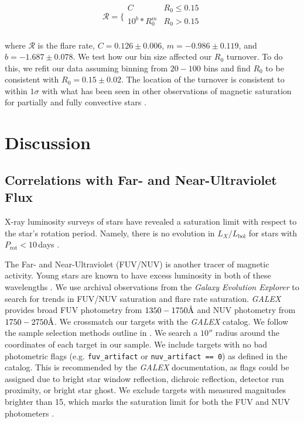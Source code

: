 \documentclass[twocolumn]{aastex631}
\newcommand{\angstrom}{\mbox{\normalfont\AA}}
\begin{document}
\begin{equation}
  \mathcal{R} =
  \Bigg \{
  \begin{array}{ll}
        C & R_0 \leq 0.15 \\
        10^b * R_0^m  & R_0 > 0.15 \\
  \end{array}
\end{equation}

where $\mathcal{R}$ is the flare rate, $C = 0.126 \pm 0.006$, $m = -0.986 \pm 0.119$, and $b = -1.687 \pm 0.078$.
We test how our bin size affected our $R_0$ turnover. To do this, we refit our data assuming binning from $20 - 100$
bins and find $R_0$ to be consistent with $R_0 = 0.15 \pm 0.02$. The location of the turnover is consistent to
within $1\sigma$ with what has been seen in other observations of magnetic saturation for partially and
fully convective stars \citep[e.g. $L_X/L_\textrm{bol}$; ][]{wright18}.

\section{Discussion}\label{sec:discuss}


\subsection{Correlations with Far- and Near-Ultraviolet Flux}

X-ray luminosity surveys of stars have revealed a saturation limit with respect to
the star's rotation period. Namely, there is no evolution in $L_X/L_\textrm{bol}$ for
stars with $P_\textrm{rot} < 10$\,days \citep{Pizzolato03}.

The Far- and Near-Ultraviolet (FUV/NUV) is another tracer of magnetic activity. Young
stars are known to have excess luminosity in both of these wavelengths \citep{}. We use
archival observations from the \textit{Galaxy Evolution Explorer}
\citep[\textit{GALEX};][]{martin05} to search for trends in FUV/NUV saturation and flare
rate saturation. \textit{GALEX} provides broad FUV photometry from $1350-1750 \angstrom$
and NUV photometry from $1750-2750 \angstrom$. We crossmatch our targets with the \textit{GALEX}
catalog. We follow the sample selection methods outline in \citep{schneider18}. We search
a $10''$ radius around the coordinates of each target in our sample. We include targets with
no bad photometric flags (e.g. \texttt{fuv\_artifact} or \texttt{nuv\_artifact == 0}) as defined
in the catalog. This is recommended by the \textit{GALEX} documentation, as flags could be
assigned due to bright star window reflection, dichroic reflection, detector run proximity,
or bright star ghost. We exclude targets with measured magnitudes brighter than 15, which
marks the saturation limit for both the FUV and NUV photometers \citep{morrissey07}.
\end{document}
